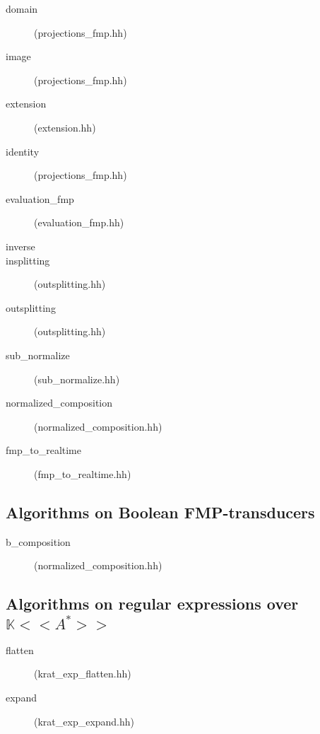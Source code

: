 \documentclass[a4paper]{report}
\begin{document}
\begin{description}
\item[domain] (projections\_fmp.hh)
\item[image] (projections\_fmp.hh)
\item[extension] (extension.hh)
\item[identity] (projections\_fmp.hh)
\item[evaluation\_fmp] (evaluation\_fmp.hh)
\item[inverse]
\item[insplitting] (outsplitting.hh)
\item[outsplitting] (outsplitting.hh)
\item[sub\_normalize] (sub\_normalize.hh)
\item[normalized\_composition] (normalized\_composition.hh)
\item[fmp\_to\_realtime] (fmp\_to\_realtime.hh)
\end{description}

\subsection{Algorithms on Boolean FMP-transducers}

\begin{description}
\item[b\_composition] (normalized\_composition.hh)
\end{description}

\subsection{Algorithms on regular expressions over $\mathbb{K}<<A^*>>$}

\begin{description}
\item[flatten] (krat\_exp\_flatten.hh)
\item[expand] (krat\_exp\_expand.hh)
\end{description}

\printindex



\end{document}
